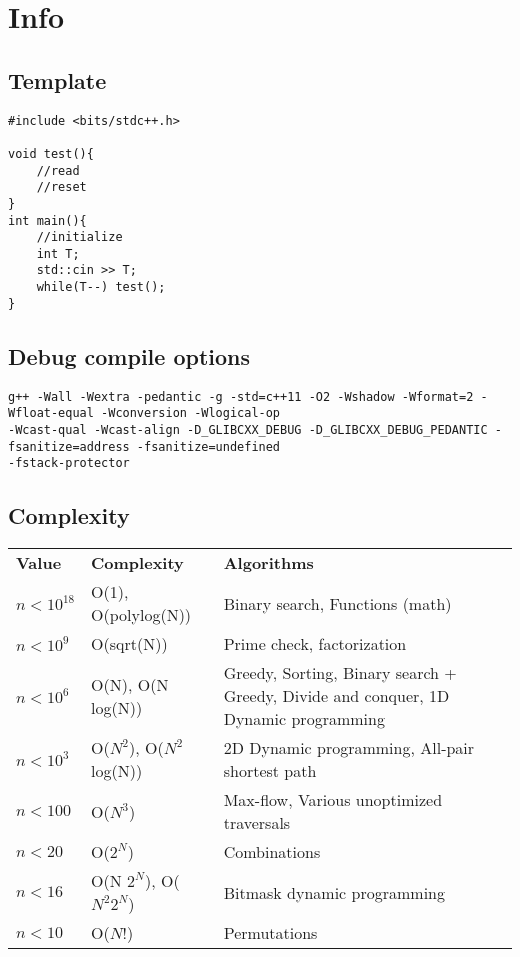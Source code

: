 \section{Info}
\subsection{Template}
\begin{verbatim}
#include <bits/stdc++.h>

void test(){
	//read
	//reset
}
int main(){
	//initialize
	int T;
	std::cin >> T;
	while(T--) test();
}
\end{verbatim}

\subsection{Debug compile options}
\begin{verbatim}
g++ -Wall -Wextra -pedantic -g -std=c++11 -O2 -Wshadow -Wformat=2 -Wfloat-equal -Wconversion -Wlogical-op 
-Wcast-qual -Wcast-align -D_GLIBCXX_DEBUG -D_GLIBCXX_DEBUG_PEDANTIC -fsanitize=address -fsanitize=undefined 
-fstack-protector
\end{verbatim}

\subsection{Complexity}
\begin{tabular}[pos]{p{3cm}p{5cm}p{8cm}}
\textbf{Value} & \textbf{Complexity} & \textbf{Algorithms}\\
$n<10^{18}$ & O(1), O(polylog(N)) & Binary search, Functions (math)\\
$n<10^9$ & O(sqrt(N)) & Prime check, factorization\\
$n<10^6$ & O(N), O(N log(N)) & Greedy, Sorting, Binary search + Greedy, Divide and conquer, 1D Dynamic programming\\
$n<10^3$ & O($N^2$), O($N^2$ log(N)) & 2D Dynamic programming, All-pair shortest path\\
$n<100$ & O($N^3$) & Max-flow, Various unoptimized traversals\\
$n<20$ & O($2^N$) & Combinations\\
$n<16$ & O(N $2^N$), O($N^2 2^N$) & Bitmask dynamic programming\\
$n<10$ & O($N!$) & Permutations\\
\end{tabular}

